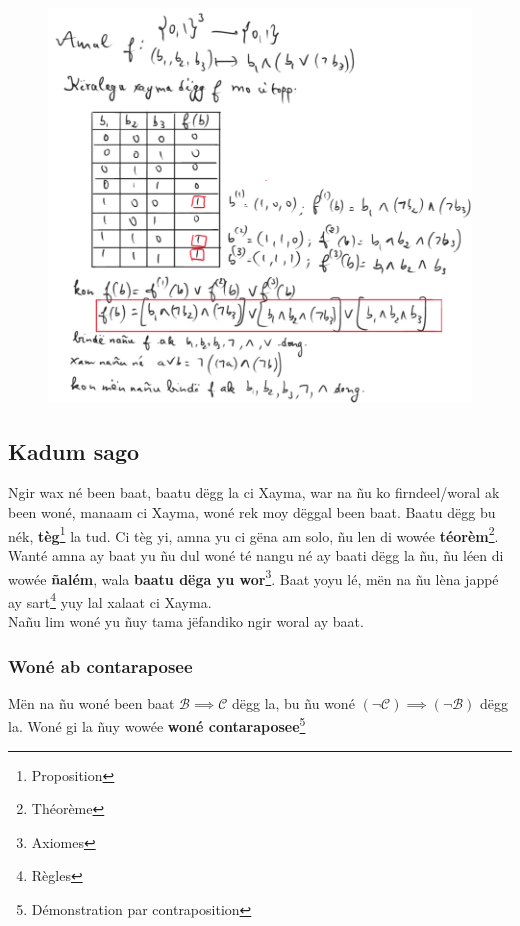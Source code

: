 \documentclass[twoside, a4paper]{article}
\begin{document}
\begin{figure}[ht]
    \centering
    \includegraphics[scale = 0.5]{image/informatik0.png}
    \label{fig:informatik0}
\end{figure}


\subsection{Kadum sago}
Ngir wax né been baat, baatu dëgg la ci Xayma, war na ñu ko firndeel/woral ak been woné, manaam ci Xayma, woné rek moy dëggal been baat. Baatu dëgg bu nék, \textbf{tèg}\footnote{Proposition} la tud. Ci tèg yi, amna yu ci gëna am solo, ñu len di wowée \textbf{téorèm}\footnote{Théorème}. Wanté amna ay baat yu ñu dul woné té nangu né ay baati dëgg la ñu, ñu léen di wowée \textbf{ñalém}, wala \textbf{baatu dëga yu wor}\footnote{Axiomes}. Baat yoyu lé, mën na ñu lèna jappé ay sart\footnote{Règles} yuy lal xalaat ci Xayma.\\


Nañu lim woné yu ñuy tama jëfandiko ngir woral ay baat.

\subsubsection{Woné ab contaraposee}
\begin{tcolorbox}[enhanced jigsaw,breakable,pad at break*=1mm, colback=red!5!white,colframe=white!75!black,title= Téeki,
  watermark color=white]
Mën na ñu woné been baat $\mathcal{B} \implies \mathcal{C}$ dëgg la, bu ñu woné  $(\neg\mathcal{C}) \implies (\neg \mathcal{B})$ dëgg la. Woné gi la ñuy wowée \textbf{woné contaraposee}\footnote{Démonstration par contraposition}


\end{tcolorbox}
\end{document}
